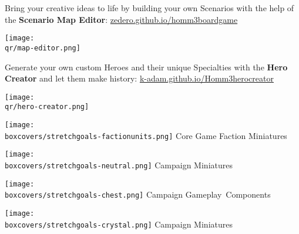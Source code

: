 \begin{multicols}{2}
\begin{itemize}
    \begin{minipage}{5cm}
        \item Bring your creative ideas to life by building your own Scenarios with the help of the \textbf{Scenario Map Editor}:
        {\footnotesize \href{https://zedero.github.io/homm3boardgame/}{zedero.github.io/homm3boardgame}}
    \end{minipage}
    \hfill
    \begin{minipage}{2cm}
        \begin{center}
            \texttt{[image: \\qr/map-editor.png]}
            \scriptsize {}
        \end{center}
    \end{minipage}\par
    \smallskip
    \begin{minipage}{5cm}
    \item Generate your own custom Heroes and their unique Specialties with the \textbf{Hero Creator} and let them make history:
      \mbox{\footnotesize \href{https://k-adam.github.io/Homm3_hero_creator}{k-adam.github.io/Homm3\textunderscore{}hero\textunderscore{}creator}}
    \end{minipage}
    \hfill
    \begin{minipage}{2cm}
        \begin{center}
            \texttt{[image: \\qr/hero-creator.png]}
            \scriptsize {}
        \end{center}
    \end{minipage}\par
  \end{itemize}
\end{multicols}
\begin{multicols}{4}
    \begin{center}
        \texttt{[image: \\boxcovers/stretchgoals-factionunits.png]}\newline
        \footnotesize Core Game Faction Miniatures\par
        \columnbreak
        \texttt{[image: \\boxcovers/stretchgoals-neutral.png]}\newline
        \footnotesize {} Campaign Miniatures\par
        \columnbreak
        \texttt{[image: \\boxcovers/stretchgoals-chest.png]}\newline
        \footnotesize {} Campaign \mbox{Gameplay Components}\par
        \columnbreak
        \texttt{[image: \\boxcovers/stretchgoals-crystal.png]}\newline
        \footnotesize {} Campaign Miniatures\par
    \end{center}
\end{multicols}
